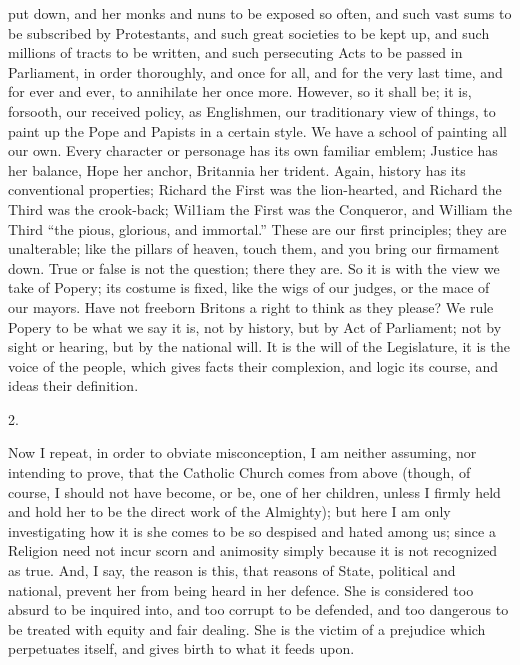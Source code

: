 put down, and her monks and nuns to be exposed so often,
and such vast sums to be subscribed by Protestants, and
such great societies to be kept up, and such millions of
tracts to be written, and such persecuting Acts to be
passed in Parliament, in order thoroughly, and once for
all, and for the very last time, and for ever and ever,
to annihilate her once more. However, so it shall be; it
is, forsooth, our received policy, as Englishmen, our
traditionary view of things, to paint up the Pope and
Papists in a certain style. We have a school of painting
all our own. Every character or personage has its own
familiar emblem; Justice has her balance, Hope her
anchor, Britannia her trident. Again, history has its
conventional properties; Richard the First was the lion-hearted, and Richard the Third was the crook-back; Wil1iam the First was the Conqueror, and William the
Third ``the pious, glorious, and immortal.''
These are our first principles; they are unalterable;
like the pillars of heaven, touch them, and you bring our
firmament down. True or false is not the question; there
they are. So it is with the view we take of Popery; its
costume is fixed, like the wigs of our judges, or the
mace of our mayors. Have not freeborn Britons a right to
think as they please? We rule Popery to be what we say it
is, not by history, but by Act of Parliament; not by
sight or hearing, but by the national will. It is the
will of the Legislature, it is the voice of the people,
which gives facts their complexion, and logic its course,
and ideas their definition.

2.

Now I repeat, in order to obviate misconception, I am
neither assuming, nor intending to prove, that the
Catholic Church comes from above (though, of course, I
should not have become, or be, one of her children,
unless I firmly held and hold her to be the direct work
of the Almighty); but here I am only investigating how it
is she comes to be so despised and hated among us; since
a Religion need not incur scorn and animosity simply
because it is not recognized as true. And, I say, the
reason is this, that reasons of State, political and
national, prevent her from being heard in her defence.
She is considered too absurd to be inquired into, and too
corrupt to be defended, and too dangerous to be treated
with equity and fair dealing. She is the victim of a
prejudice which perpetuates itself, and gives birth to
what it feeds upon.

